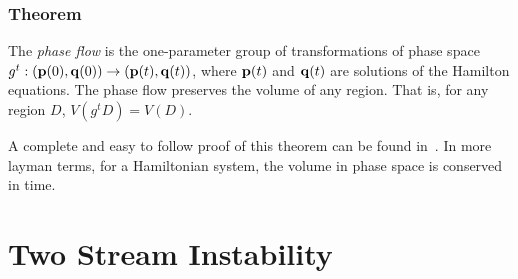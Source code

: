 \documentclass[12pt, class=report, crop=false]{standalone}
\begin{document}
\subsubsection{Theorem}
  The \textit{phase flow} is the one-parameter group of transformations of phase space
  \(g^t:(\vb{p}(0),\vb{q}(0))\rightarrow(\vb{p}(t),\vb{q}(t))\), where \(\vb{p}(t)\) and \(\vb{q}(t)\) are solutions of the Hamilton equations. The phase flow preserves the volume of any region. That is, for any region \(D\), \(V(g^tD)=V(D)\).
\newline

A complete and easy to follow proof of this theorem can be found in~\cite{arnoldMathematicalMethodsClassical1997}. In more layman terms, for a Hamiltonian system, the volume in phase space is conserved in time.

\section{Two Stream Instability}
\end{document}
